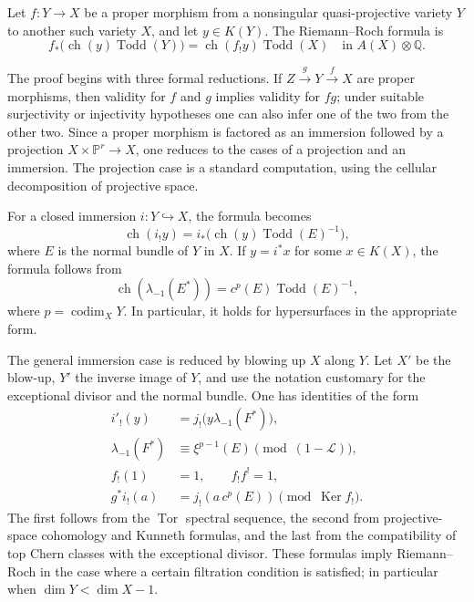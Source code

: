 \documentclass[14pt]{extarticle}
\newcommand{\QQ}{\mathbb Q}
\newcommand{\PP}{\mathbb P}
\newcommand{\cL}{\mathcal L}
\newcommand{\ch}{\operatorname{ch}}
\newcommand{\Todd}{\operatorname{Todd}}
\newcommand{\codim}{\operatorname{codim}}
\newcommand{\Tor}{\operatorname{Tor}}
\newcommand{\Ker}{\operatorname{Ker}}
\begin{document}
Let $f:Y\to X$ be a proper morphism from a nonsingular quasi-projective variety $Y$ to another such variety $X$, and let $y\in K(Y)$. The Riemann--Roch formula is
\begin{equation}\label{eq:RRreport}
   f_*\bigl(\ch(y)\Todd(Y)\bigr)=\ch(f_!y)\Todd(X)
   \quad\text{in }A(X)\otimes\QQ.
\end{equation}

The proof begins with three formal reductions. If $Z\xrightarrow gY\xrightarrow fX$ are proper morphisms, then validity for $f$ and $g$ implies validity for $fg$; under suitable surjectivity or injectivity hypotheses one can also infer one of the two from the other two. Since a proper morphism is factored as an immersion followed by a projection $X\times\PP^r\to X$, one reduces to the cases of a projection and an immersion. The projection case is a standard computation, using the cellular decomposition of projective space.

For a closed immersion $i:Y\hookrightarrow X$, the formula becomes
\begin{equation}\label{eq:RRimmersion}
   \ch(i_!y)=i_*\bigl(\ch(y)\Todd(E)^{-1}\bigr),
\end{equation}
where $E$ is the normal bundle of $Y$ in $X$. If $y=i^*x$ for some $x\in K(X)$, the formula follows from
\begin{equation}\label{eq:lambdanormal}
   \ch(\lambda_{-1}(E^*))=c^p(E)\Todd(E)^{-1},
\end{equation}
where $p=\codim_XY$. In particular, it holds for hypersurfaces in the appropriate form.

The general immersion case is reduced by blowing up $X$ along $Y$. Let $X'$ be the blow-up, $Y'$ the inverse image of $Y$, and use the notation customary for the exceptional divisor and the normal bundle. One has identities of the form
\begin{align*}
 i'_!(y) &= j_!\bigl(y\lambda_{-1}(F^*)\bigr),\\
 \lambda_{-1}(F^*) &\equiv \xi^{p-1}(E)\pmod{(1-\cL)},\\
 f_!(1)&=1,
 \qquad f_!f^!=1,\\
 g^*i_!(a)&=j_!(a\,c^p(E))\pmod{\Ker f_!}.
\end{align*}
The first follows from the $\Tor$ spectral sequence, the second from projective-space cohomology and Kunneth formulas, and the last from the compatibility of top Chern classes with the exceptional divisor. These formulas imply Riemann--Roch in the case where a certain filtration condition is satisfied; in particular when $\dim Y<\dim X-1$.
\end{document}
